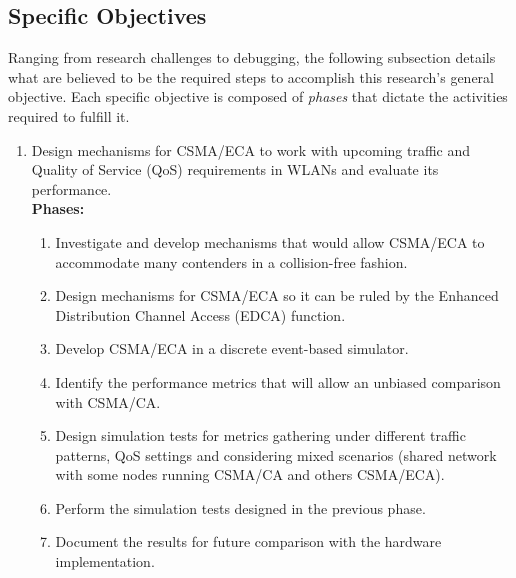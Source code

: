\subsection{Specific Objectives}
Ranging from research challenges to debugging, the following subsection details what are believed to be the required steps to accomplish this research's general objective. Each specific objective is composed of \emph{phases} that dictate the activities required to fulfill it.
\begin{enumerate}

	\item Design mechanisms for CSMA/ECA to work with upcoming traffic and Quality of Service (QoS) requirements in WLANs and evaluate its performance.\\
	
	{\bfseries Phases:}
	\begin{enumerate}
		\item Investigate and develop mechanisms that would allow CSMA/ECA to accommodate many contenders in a collision-free fashion.\label{ECAHysteresis}
		\item Design mechanisms for CSMA/ECA so it can be ruled by the Enhanced Distribution Channel Access (EDCA) function.
		\item Develop CSMA/ECA in a discrete event-based simulator.\label{incorporateECA}
		\item Identify the performance metrics that will allow an unbiased comparison with CSMA/CA.\label{metrics}
		\item Design simulation tests for metrics gathering under different traffic patterns, QoS settings and considering mixed scenarios (shared network with some nodes running CSMA/CA and others CSMA/ECA).\label{scenarios}
		\item Perform the simulation tests designed in the previous phase.
		\item Document the results for future comparison with the hardware implementation.\label{simulationResults}\\
	\end{enumerate}



\end{enumerate}
